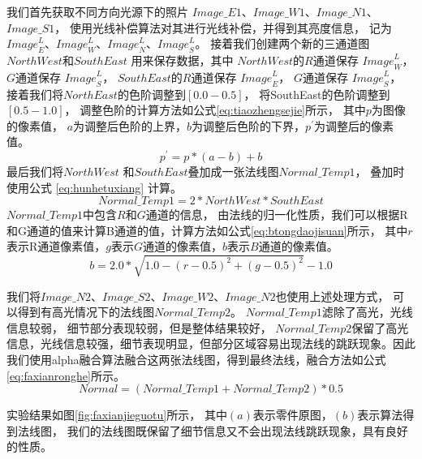 我们首先获取不同方向光源下的照片
$Image\_E1$、$Image\_W1$、$Image\_N1$、$Image\_S1$，
使用光线补偿算法对其进行光线补偿，并得到其亮度信息，
记为
${Image}_E^L$、${Image}_W^L$、${Image}_N^L$、${Image}_S^L$。
接着我们创建两个新的三通道图
$NorthWest$和$SouthEast$
用来保存数据，其中
$NorthWest$的$R$通道保存
${Image}_W^L$，
$G$通道保存
${Image}_S^L$，
$SouthEast$的$R$通道保存
${Image}_E^L$，
$G$通道保存
${Image}_S^L$，
接着我们将$NorthEast$的色阶调整到$[0.0-0.5]$，
将SouthEast的色阶调整到$[0.5-1.0]$，
调整色阶的计算方法如公式\eqref{eq:tiaozhengsejie}所示，
其中$p$为图像的像素值，
$a$为调整后色阶的上界，$b$为调整后色阶的下界，${p}^{'}$为调整后的像素值。
\begin{equation}
\label{eq:tiaozhengsejie}
{p}^{'}=p* (a-b)+b
\end{equation}
最后我们将$NorthWest$
和$SouthEast$叠加成一张法线图$Normal\_Temp1$，
叠加时使用公式
\eqref{eq:hunhetuxiang}
计算。
\begin{equation}
\label{eq:hunhetuxiang}
Normal\_Temp1=2* NorthWest* SouthEast
\end{equation}
$Normal\_Temp1$中包含$R$和$G$通道的信息，
由法线的归一化性质，我们可以根据R和G通道的值来计算B通道的值，计算方法如公式\eqref{eq:btongdaojisuan}所示，
其中$r$表示R通道像素值，$g$表示$G$通道的像素值，$b$表示$B$通道的像素值。
\begin{equation}
\label{eq:btongdaojisuan}
b=2.0* \sqrt{1.0-{(r-0.5)}^2+{(g-0.5)}^2}-1.0
\end{equation}

我们将$Image\_N2$、$Image\_S2$、$Image\_W2$、$Image\_N2$也使用上述处理方式，
可以得到有高光情况下的法线图$Normal\_Temp2$。
$Normal\_Temp1$滤除了高光，光线信息较弱，
细节部分表现较弱，但是整体结果较好，
$Normal\_Temp2$保留了高光信息，光线信息较强，细节表现明显，但部分区域容易出现法线的跳跃现象。因此我们使用alpha融合算法融合这两张法线图，得到最终法线，融合方法如公式
\eqref{eq:faxianronghe}所示。
\begin{equation}
\label{eq:faxianronghe}
Normal=(Normal\_Temp1+Normal\_Temp2)* 0.5
\end{equation}

实验结果如图\ref{fig:faxianjieguotu}所示，
其中$(a)$表示零件原图，$(b)$表示算法得到法线图，
我们的法线图既保留了细节信息又不会出现法线跳跃现象，具有良好的性质。

